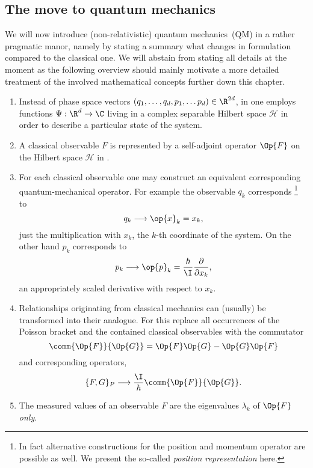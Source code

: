 \subsection{The move to quantum mechanics}
\label{sec:IntroQM}
\defineabbr{QM}{QM\xspace}{quantum mechanics}
We will now introduce (non-relativistic)
quantum mechanics~(QM) in a rather pragmatic manor,
namely by stating a summary what changes in \QM formulation
compared to the classical one.
We will abstain from stating all details at the moment
as the following overview should mainly motivate a more detailed
treatment of the involved mathematical concepts further down this chapter.

\newcommand{\hilbert}{\mathcal{H}}
\begin{enumerate}
	\item Instead of phase space vectors $\clphase \in \R^{2d}$,
		in \QM one employs functions $\Psi : \R^d \to \C$
		living in a complex separable Hilbert space $\hilbert$
		in order to describe a particular state of the system.
	\item A classical observable $F$ is represented by a
		self-adjoint operator $\Op{F}$ on the Hilbert space $\hilbert$ in \QM.
	\item For each classical observable one may construct an equivalent
		corresponding quantum-mechanical operator.
		For example the observable $q_k$ corresponds%
		\footnote{In fact alternative constructions for the position and momentum
				operator are possible as well. We present the so-called
				\textit{position representation} here.}
		to
		\[ q_k \longrightarrow \op{x}_k = x_k, \]
		\ie just the multiplication with $x_k$,
		the $k$-th coordinate of the system.
		On the other hand $p_k$ corresponds to
		\[ p_k \longrightarrow \op{p}_k
			= \frac{\hbar}{\I} \frac{\partial}{\partial x_k}, \]
		an appropriately scaled derivative with respect to $x_k$.
	\item Relationships originating from classical mechanics
		can (usually) be transformed into their \QM analogue.
		For this replace all occurrences of the Poisson bracket
		and the contained classical observables with the commutator
		\begin{equation}
			\comm{\Op{F}}{\Op{G}} = \Op{F} \Op{G} - \Op{G} \Op{F}
			\label{eqn:Operator}
		\end{equation}
		and corresponding operators, \ie
		\[ \{F, G\}_P \longrightarrow \frac{\I}{\hbar} \comm{\Op{F}}{\Op{G}}. \]
	\item The measured values of an observable $F$
		are the eigenvalues $\lambda_k$ of $\Op{F}$ \emph{only}.

\end{enumerate}

